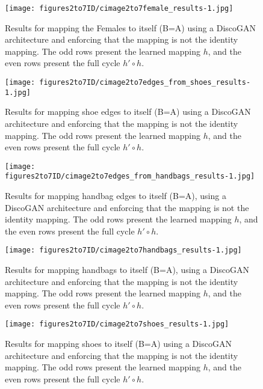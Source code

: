 \documentclass{article} %
\begin{document}
\begin{figure}[t]
  \centering
\texttt{[image: figures2to7ID/cimage2to7female\_results-1.jpg]}

  \caption{\label{fig:c004} Results for mapping the Females to itself (B=A) using a DiscoGAN architecture and enforcing that the mapping is not the identity mapping. The odd rows present the learned mapping $h$, and the even rows present the full cycle $h'\circ h$.}

\end{figure}

\begin{figure}[t]
  \centering
\texttt{[image: figures2to7ID/cimage2to7edges\_from\_shoes\_results-1.jpg]}

  \caption{\label{fig:c001} Results for mapping shoe edges to itself (B=A) using a DiscoGAN architecture and enforcing that the mapping is not the identity mapping. The odd rows present the learned mapping $h$, and the even rows present the full cycle $h'\circ h$.}

\end{figure}

\begin{figure}[t]
  \centering
\texttt{[image: figures2to7ID/cimage2to7edges\_from\_handbags\_results-1.jpg]}
  \caption{\label{fig:c002} Results for mapping handbag edges to itself (B=A), using a DiscoGAN architecture and enforcing that the mapping is not the identity mapping. The odd rows present the learned mapping $h$, and the even rows present the full cycle $h'\circ h$.}
\end{figure}

\begin{figure}[t]
  \centering
\texttt{[image: figures2to7ID/cimage2to7handbags\_results-1.jpg]}
  \caption{\label{fig:c005} Results for mapping handbags to itself (B=A), using a DiscoGAN architecture and enforcing that the mapping is not the identity mapping. The odd rows present the learned mapping $h$, and the even rows present the full cycle $h'\circ h$.}
\end{figure}

\begin{figure}[t]
  \centering
\texttt{[image: figures2to7ID/cimage2to7shoes\_results-1.jpg]}
  \caption{\label{fig:c006} Results for mapping shoes to itself (B=A) using a DiscoGAN architecture and enforcing that the mapping is not the identity mapping. The odd rows present the learned mapping $h$, and the even rows present the full cycle $h'\circ h$.}
\end{figure}
\end{document}

